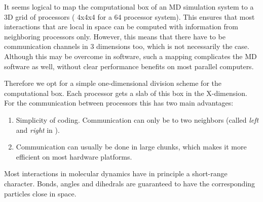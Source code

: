 It seems logical to map the computational box of an MD simulation system 
to a 3D grid of 
processors ({\eg} 4x4x4 for a 64 processor system). This ensures that most 
interactions that are local in space can be computed with information from 
neighboring processors only. However, this means that there have to be
communication channels in 3 dimensions too, which is not necessarily the case.
Although this may be overcome in software, such a mapping complicates the MD
software as well, without clear performance benefits on most
parallel computers. 

Therefore we opt for a simple one-dimensional division scheme
for the computational box. Each processor gets a slab of this box in the 
X-dimension.
For the communication between processors this has two main advantages:
\begin{enumerate}
\item   Simplicity of coding. Communication can only be to two neighbors
        (called {\em left} and {\em right} in {\gromacs}).
\item   Communication can usually be done in large chunks, which makes it
        more efficient on most hardware platforms.
\end{enumerate}

Most interactions in molecular dynamics have in principle a
short-range character.  Bonds, angles and dihedrals are guaranteed to
have the corresponding particles close in space.


